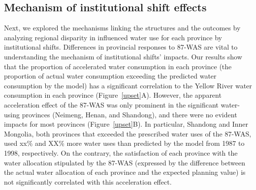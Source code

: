 
\subsection{Mechanism of institutional shift effects}
\label{result-2}

Next, we explored the mechanisms linking the structures and the outcomes by analyzing regional disparity in influenced water use for each province by institutional shifts.
Differences in provincial responses to 87-WAS are vital to understanding the mechanism of institutional shifts' impacts.
Our results show that the proportion of accelerated water consumption in each province (the proportion of actual water consumption exceeding the predicted water consumption by the model) has a significant correlation to the Yellow River water consumption in each province (Figure~\ref{upset}A).
However, the apparent acceleration effect of the 87-WAS was only prominent in the significant water-using provinces (Neimeng, Henan, and Shandong), and there were no evident impacts for most provinces (Figure~\ref{upset}B).
In particular, Shandong and Inner Mongolia, both provinces that exceeded the prescribed water uses of the 87-WAS, used xx\% and XX\% more water uses than predicted by the model from 1987 to 1998, respectively.
On the contrary, the satisfaction of each province with the water allocation stipulated by the 87-WAS (expressed by the difference between the actual water allocation of each province and the expected planning value) is not significantly correlated with this acceleration effect.

